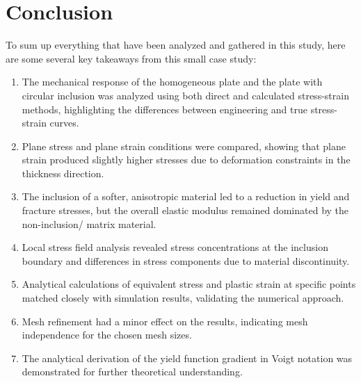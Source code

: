 \documentclass[12pt]{article}
\begin{document}
\section*{Conclusion}
To sum up everything that have been analyzed and gathered in this study, 
here are some several key takeaways from this small case study:
\begin{enumerate}
    \item The mechanical response of the homogeneous plate and the plate with circular inclusion was analyzed 
    using both direct and calculated stress-strain methods, 
    highlighting the differences between engineering and true stress-strain curves.
    \item Plane stress and plane strain conditions were compared, 
    showing that plane strain produced slightly higher stresses due to deformation constraints in the thickness direction.
    \item The inclusion of a softer, anisotropic material led to a reduction in yield and fracture stresses, 
    but the overall elastic modulus remained dominated by the non-inclusion/
    matrix material.
    \item Local stress field analysis revealed stress concentrations at the inclusion boundary and differences 
    in stress components due to material discontinuity.
    \item Analytical calculations of equivalent stress and plastic strain at specific points 
    matched closely with simulation results, validating the numerical approach.
    \item Mesh refinement had a minor effect on the results, indicating mesh independence for the chosen mesh sizes.
    \item The analytical derivation of the yield function gradient in Voigt notation was demonstrated for further 
    theoretical understanding.
\end{enumerate}
\end{document}
